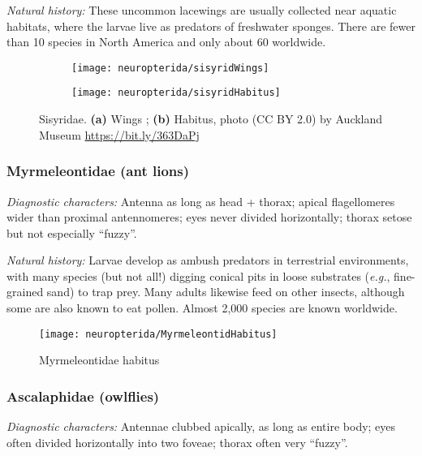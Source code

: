 \noindent{}\textit{Natural history:} These uncommon lacewings are usually collected near aquatic habitats, where the larvae live as predators of freshwater sponges. There are fewer than 10 species in North America and only about 60 worldwide.\vspace{3mm}

\begin{figure}[ht!]
    \centering
    \begin{subfigure}[ht!]{0.31\textwidth}
      \centering
        \texttt{[image: neuropterida/sisyridWings]}
        \caption{}
        \label{fig:sisyrid}
    \end{subfigure}
    \hfill
    \begin{subfigure}[ht!]{0.55\textwidth}
        \texttt{[image: neuropterida/sisyridHabitus]}
        \caption{}
        \label{fig:sisyrid2}
    \end{subfigure}
    \caption{Sisyridae. \textbf{(a)} Wings \citep[][Fig. 328]{bhl29907}; \textbf{(b)} Habitus, photo (CC BY 2.0) by Auckland Museum \url{https://bit.ly/363DaPj} }\label{fig:sisyrids}
\end{figure}

\subsubsection{Myrmeleontidae (ant lions)}
\noindent{}\textit{Diagnostic characters:} Antenna as long as head + thorax; apical flagellomeres wider than proximal antennomeres; eyes never divided horizontally; thorax setose but not especially ``fuzzy''.\vspace{3mm}

\noindent{}\textit{Natural history:} Larvae develop as ambush predators in terrestrial environments, with many species (but not all!) digging conical pits in loose substrates (\textit{e.g.}, fine-grained sand) to trap prey. Many adults likewise feed on other insects, although some are also known to eat pollen. Almost 2,000 species are known worldwide.\vspace{3mm}

\begin{figure}[ht!]
  \centering
\texttt{[image: neuropterida/MyrmeleontidHabitus]}
  \caption{Myrmeleontidae habitus \citep[][Fig. III.8]{tillyard1916}}
  \label{fig:myrmeleo}
\end{figure}

\subsubsection{Ascalaphidae (owlflies)}
\noindent{}\textit{Diagnostic characters:} Antennae clubbed apically, as long as entire body; eyes often divided horizontally into two foveae; thorax often very ``fuzzy''.\vspace{3mm}

